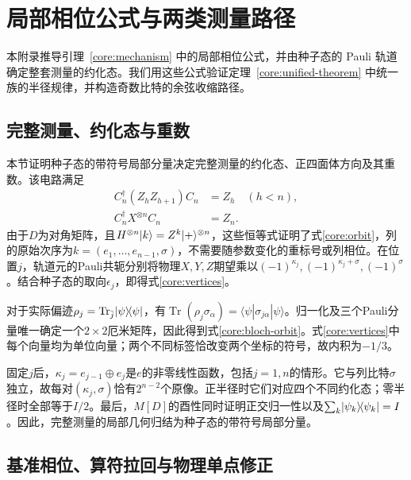 \section{局部相位公式与两类测量路径}
\label{core:appendix}

本附录推导引理~\ref{core:mechanism} 中的局部相位公式，并由种子态的 Pauli 轨道确定整套测量的约化态。我们用这些公式验证定理~\ref{core:unified-theorem} 中统一族的半径规律，并构造奇数比特的余弦收缩路径。

\subsection{完整测量、约化态与重数}
\label{core:full-measurement}

本节证明种子态的带符号局部分量决定完整测量的约化态、正四面体方向及其重数。该电路满足
\begin{equation}
 \begin{aligned}
 C_n^\dagger(Z_hZ_{h+1})C_n&=Z_h\quad(h<n),\\
 C_n^\dagger X^{\otimes n}C_n&=Z_n.
 \end{aligned}
\end{equation}
由于$D$为对角矩阵，且$H^{\otimes n}\lvert k\rangle=Z^k\lvert +\rangle^{\otimes n}$，这些恒等式证明了式\eqref{core:orbit}，列的原始次序为$k=(e_1,\ldots,e_{n-1},\sigma)$，不需要随参数变化的重标号或列相位。在位置$j$，轨道元的Pauli共轭分别将物理$X,Y,Z$期望乘以$(-1)^{\kappa_j},(-1)^{\kappa_j+\sigma},(-1)^\sigma$。结合种子态的取向$\epsilon_j$，即得式\eqref{core:vertices}。

对于实际偏迹$\rho_j=\operatorname{Tr}_{\bar j}\lvert \psi\rangle\!\langle \psi\rvert$，有$\operatorname{Tr}(\rho_j\sigma_\alpha)=\langle\psi|\sigma_{j\alpha}|\psi\rangle$。归一化及三个Pauli分量唯一确定一个$2\times2$厄米矩阵，因此得到式\eqref{core:bloch-orbit}。式\eqref{core:vertices}中每个向量均为单位向量；两个不同标签恰改变两个坐标的符号，故内积为$-1/3$。

固定$j$后，$\kappa_j=e_{j-1}\oplus e_j$是$e$的非零线性函数，包括$j=1,n$的情形。它与列比特$\sigma$独立，故每对$(\kappa_j,\sigma)$恰有$2^{n-2}$个原像。正半径时它们对应四个不同约化态；零半径时全部等于$I/2$。最后，$M[D]$的酉性同时证明正交归一性以及$\sum_k\lvert \psi_k\rangle\!\langle \psi_k\rvert=I$。因此，完整测量的局部几何归结为种子态的带符号局部分量。

\subsection{基准相位、算符拉回与物理单点修正}
\label{core:pullbacks}

